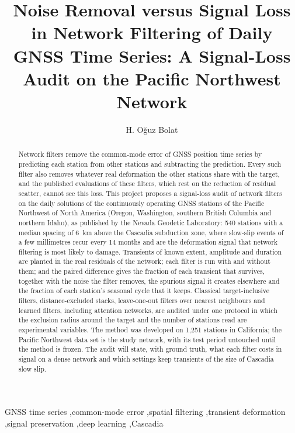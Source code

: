 \documentclass[preprint,12pt,authoryear]{elsarticle}
\begin{document}
\begin{frontmatter}

  \title{Noise Removal versus Signal Loss in Network Filtering of Daily GNSS Time Series: A Signal-Loss Audit on the Pacific Northwest Network}

  \author{H. O\u{g}uz Bolat}

  \begin{abstract}
    Network filters remove the common-mode error of GNSS position time series by predicting each station from other stations and subtracting the prediction. Every such filter also removes whatever real deformation the other stations share with the target, and the published evaluations of these filters, which rest on the reduction of residual scatter, cannot see this loss. This project proposes a signal-loss audit of network filters on the daily solutions of the continuously operating GNSS stations of the Pacific Northwest of North America (Oregon, Washington, southern British Columbia and northern Idaho), as published by the Nevada Geodetic Laboratory: 540 stations with a median spacing of 6~km above the Cascadia subduction zone, where slow-slip events of a few millimetres recur every 14 months and are the deformation signal that network filtering is most likely to damage. Transients of known extent, amplitude and duration are planted in the real residuals of the network; each filter is run with and without them; and the paired difference gives the fraction of each transient that survives, together with the noise the filter removes, the spurious signal it creates elsewhere and the fraction of each station's seasonal cycle that it keeps. Classical target-inclusive filters, distance-excluded stacks, leave-one-out filters over nearest neighbours and learned filters, including attention networks, are audited under one protocol in which the exclusion radius around the target and the number of stations read are experimental variables. The method was developed on 1,251 stations in California; the Pacific Northwest data set is the study network, with its test period untouched until the method is frozen. The audit will state, with ground truth, what each filter costs in signal on a dense network and which settings keep transients of the size of Cascadia slow slip.
  \end{abstract}

  \begin{keyword}
    GNSS time series \sep common-mode error \sep spatial filtering \sep transient deformation \sep signal preservation \sep deep learning \sep Cascadia
  \end{keyword}

\end{frontmatter}
\end{document}
